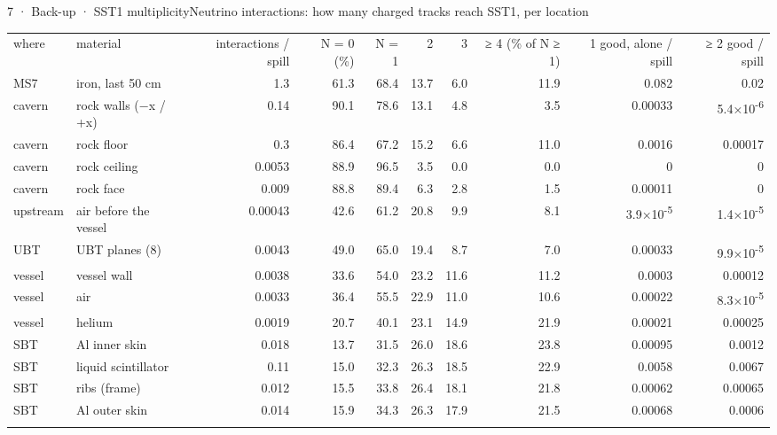 \begin{btframe}{7 · Back-up · SST1 multiplicity}{Neutrino interactions: how many charged tracks reach SST1, per location}
{\fontsize{4.9pt}{6.3pt}\selectfont\setlength{\tabcolsep}{2.8pt}\renewcommand{\arraystretch}{1.32}
\begin{tabular}{llrrrrrrrr}
\textcolor{muted}{where} & \textcolor{muted}{material} & \textcolor{muted}{interactions / spill} & \textcolor{muted}{N = 0 (\%)} & \textcolor{muted}{N = 1} & \textcolor{muted}{2} & \textcolor{muted}{3} & \textcolor{muted}{≥ 4 (\% of N ≥ 1)} & \textcolor{muted}{1 good, alone / spill} & \textcolor{muted}{≥ 2 good / spill} \\\headrule
MS7 & iron, last 50 cm & 1.3 & 61.3 & 68.4 & 13.7 & 6.0 & 11.9 & 0.082 & 0.02 \\\rowrule
cavern & rock walls (−x / +x) & 0.14 & 90.1 & 78.6 & 13.1 & 4.8 & 3.5 & 0.00033 & 5.4×10\textsuperscript{-6} \\\rowrule
cavern & rock floor & 0.3 & 86.4 & 67.2 & 15.2 & 6.6 & 11.0 & 0.0016 & 0.00017 \\\rowrule
cavern & rock ceiling & 0.0053 & 88.9 & 96.5 & 3.5 & 0.0 & 0.0 & 0 & 0 \\\rowrule
cavern & rock face & 0.009 & 88.8 & 89.4 & 6.3 & 2.8 & 1.5 & 0.00011 & 0 \\\rowrule
upstream & air before the vessel & 0.00043 & 42.6 & 61.2 & 20.8 & 9.9 & 8.1 & 3.9×10\textsuperscript{-5} & 1.4×10\textsuperscript{-5} \\\rowrule
UBT & UBT planes (8) & 0.0043 & 49.0 & 65.0 & 19.4 & 8.7 & 7.0 & 0.00033 & 9.9×10\textsuperscript{-5} \\\rowrule
vessel & vessel wall & 0.0038 & 33.6 & 54.0 & 23.2 & 11.6 & 11.2 & 0.0003 & 0.00012 \\\rowrule
vessel & air & 0.0033 & 36.4 & 55.5 & 22.9 & 11.0 & 10.6 & 0.00022 & 8.3×10\textsuperscript{-5} \\\rowrule
vessel & helium & 0.0019 & 20.7 & 40.1 & 23.1 & 14.9 & 21.9 & 0.00021 & 0.00025 \\\rowrule
SBT & Al inner skin & 0.018 & 13.7 & 31.5 & 26.0 & 18.6 & 23.8 & 0.00095 & 0.0012 \\\rowrule
SBT & liquid scintillator & 0.11 & 15.0 & 32.3 & 26.3 & 18.5 & 22.9 & 0.0058 & 0.0067 \\\rowrule
SBT & ribs (frame) & 0.012 & 15.5 & 33.8 & 26.4 & 18.1 & 21.8 & 0.00062 & 0.00065 \\\rowrule
SBT & Al outer skin & 0.014 & 15.9 & 34.3 & 26.3 & 17.9 & 21.5 & 0.00068 & 0.0006 \\\rowrule

\end{tabular}}
\end{btframe}
